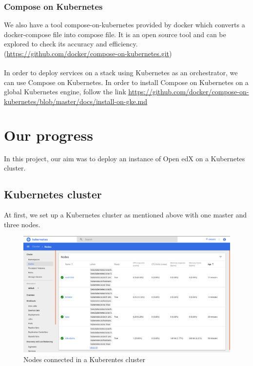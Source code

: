 \documentclass[12pt]{report}
\begin{document}
\subsection{Compose on Kubernetes}
We also have a tool compose-on-kubernetes provided by docker which converts a docker-compose file into compose file. It is an open source tool and can be explored to check its accuracy and efficiency.(\href{https://github.com/docker/compose-on-kubernetes.git}{https://github.com/docker/compose-on-kubernetes.git})\\\\
In order to deploy services on a stack using Kubernetes as an orchestrator, we can use Compose on Kubernetes. In order to install Compose on Kubernetes on a global Kubernetes engine, follow the link \url{https://github.com/docker/compose-on-kubernetes/blob/master/docs/install-on-gke.md}
\chapter{Our progress}
In this project, our aim was to deploy an instance of Open edX on a Kubernetes cluster.
\section{Kubernetes cluster}
At first, we set up a Kubernetes cluster as mentioned above with one master and three nodes.
\begin{figure}[h!]
	\begin{center}
		\includegraphics[totalheight=0.4\textheight]{cluster}
		\caption{Nodes connected in a Kuberentes cluster}
	\end{center}
\end{figure}
\\\\\\
\end{document}
